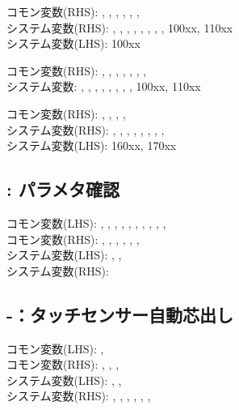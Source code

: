 \begin{hosoku}\small
コモン変数(RHS): , , , , , , \\
システム変数(RHS): , , , , , , , , \ttNum100xx, \ttNum110xx\\
システム変数(LHS): \ttNum100xx
\end{hosoku}

\begin{hosoku}\small
コモン変数(RHS): , , , , , , , \\
システム変数: , , , , , , , , \ttNum100xx, \ttNum110xx
\end{hosoku}

\begin{hosoku}\small
コモン変数(RHS): , , , , \\
システム変数(RHS): , , , , , , , , \\
システム変数(LHS): \ttNum160xx, \ttNum170xx
\end{hosoku}

\subsection{: パラメタ確認}
\begin{hosoku}\small
コモン変数(LHS): , , , , , , , , , , \\
コモン変数(RHS): , , , , , , \\
システム変数(LHS): , , \\
システム変数(RHS): 
\end{hosoku}

\subsection{-：タッチセンサー自動芯出し}
\begin{hosoku}\small
コモン変数(LHS): , \\
コモン変数(RHS): , , , \\
システム変数(LHS): , , \\
システム変数(RHS): , , , , , , 
\end{hosoku}

